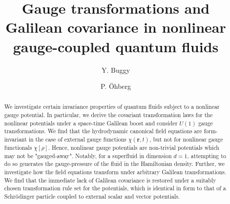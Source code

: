 \documentclass[twocolumn, nofootinbib, nobibnotes, amsmath,amssymb,aps, pra, floatfix]{revtex4-1}
\renewcommand{\v}[1]{\ensuremath{\mathbf{#1}}} %
\begin{document}

\title{Gauge transformations and Galilean covariance in nonlinear gauge-coupled quantum fluids}%

\author{Y. Buggy}
 \author{P. {\"O}hberg}


\begin{abstract}
    We investigate certain invariance properties of quantum fluids subject to a nonlinear gauge potential.
	In particular, we derive the covariant transformation laws for the nonlinear potentials under a space-time Galilean boost and consider $U\left( 1 \right)$ gauge transformations.
    We find that the hydrodynamic canonical field equations are form-invariant in the case of external gauge functions $\chi(\v{r}, t)$, but not for nonlinear gauge functionals $\chi[\rho]$.
    Hence, nonlinear gauge potentials are non-trivial potentials which may not be "gauged-away".
    Notably, for a superfluid in dimension $d=1$, attempting to do so generates the gauge-pressure of the fluid in the Hamiltonian density.
    Further, we investigate how the field equations transform under arbitrary Galilean transformations.
    We find that the immediate lack of Galilean covariance is restored under a suitably chosen transformation rule set for the potentials, which is identical in form to that of a Schr\"odinger particle coupled to external scalar and vector potentials.


\end{abstract}

\maketitle
\end{document}

